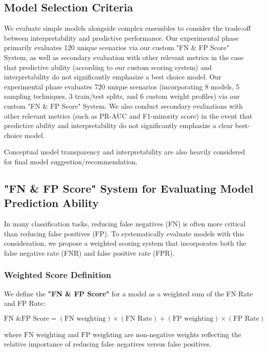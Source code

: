 \documentclass{article}
\begin{document}
\subsection{Model Selection Criteria}
We evaluate simple models alongside complex ensembles to consider the trade-off between interpretability and predictive performance.
Our experimental phase primarily evaluates 120 unique scenarios via our custom "FN \& FP Score" System, as well as secondary evaluation with other relevant metrics in the case that predictive ability (according to our custom scoring system) and interpretability do not significantly emphasize a best choice model.
Our experimental phase evaluates 720 unique scenarios (incorporating 8 models, 5 sampling techniques, 3 train/test splits, and 6 custom weight profiles) via our custom "FN \& FP Score" System. We also conduct secondary evaluations with other relevant metrics (such as PR-AUC and F1-minority score) in the event that predictive ability and interpretability do not significantly emphasize a clear best-choice model.

Conceptual model transparency and interpretability are also heavily considered for final model suggestion/recommendation.
  
\subsection{"FN \& FP Score" System for Evaluating Model Prediction Ability}

In many classification tasks, reducing false negatives (FN) is often more critical than reducing false positives (FP). To systematically evaluate models with this consideration, we propose a weighted scoring system that incorporates both the false negative rate (FNR) and false positive rate (FPR).

\subsubsection{Weighted Score Definition}
We define the \textbf{"FN \& FP Score"} for a model as a weighted sum of the FN Rate and FP Rate:

\begin{equation}
\text{FN \& FP Score} = (\text{FN weighting}) \times (\text{FN Rate}) + (\text{FP weighting}) \times (\text{FP Rate})
\end{equation}

where \(\text{FN weighting}\) and \(\text{FP weighting}\) are non-negative weights reflecting the relative importance of reducing false negatives versus false positives.
\end{document}
